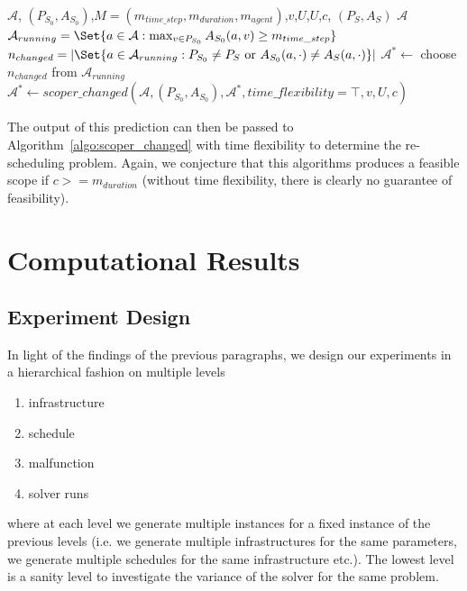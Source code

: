 \documentclass{article}
\begin{document}
\begin{algorithm}
	\caption{$scoper\_offline\_random$} \label{algo:scoper_random}
	\begin{algorithmic}[1]
		\Require $\mathcal{A}$, $(P_{S_0},A_{S_0})$,$M=(m_{time\_step},m_{duration},m_{agent})$,$v$,$U$,$U$,$c$, $(P_S,A_S)$
	    \Ensure $\mathcal{A}$
	    \State $\mathcal{A}_{running}=\Set{a \in \mathcal{A}: \max_{v \in P_{S_0}} A_{S_0}(a,v) \geq m_{time\_step}}$
	    \State $n_{changed} = \left| \Set{a\in \mathcal{A}_{running}:  P_{S_0} \not=P_{S} \textrm { or } A_{S_0}(a,\cdot) \not= A_{S}(a,\cdot)} \right|$
	    \State $\mathcal{A}^* \leftarrow$ choose $n_{changed}$ from $\mathcal{A}_{running}$
	    \State $\mathcal{A}^* \leftarrow scoper\_changed(\mathcal{A},(P_{S_0},A_{S_0}),\mathcal{A}^*,time\_flexibility=\top,v,U,c)$
	\end{algorithmic}
\end{algorithm}
The output of this prediction can then be passed to Algorithm~\ref{algo:scoper_changed} with time flexibility to determine the re-scheduling problem.
Again, we conjecture that this algorithms produces a feasible scope if $c >= m_{duration}$ (without time flexibility, there is clearly no guarantee of feasibility).


\section{Computational Results}\label{sec:Results}




\subsection{Experiment Design}

In light of the findings of the previous paragraphs, we design our experiments in a hierarchical fashion on multiple levels
\begin{enumerate}
    \item infrastructure
    \item schedule
    \item malfunction
    \item solver runs
\end{enumerate}
where at each level we generate multiple instances for a fixed instance of the previous levels (i.e. we generate multiple infrastructures for the same parameters, we generate multiple schedules for the same infrastructure etc.). The lowest level is a sanity level to investigate the variance of the solver for the same problem.
\end{document}
